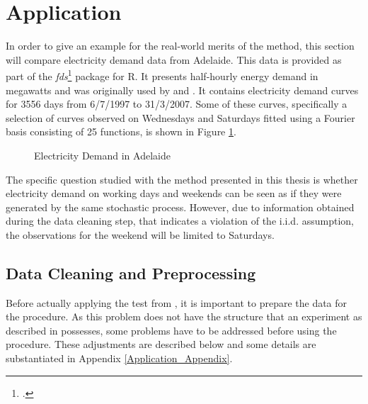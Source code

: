 \documentclass[12pt, a4paper]{article}
\theoremstyle{MAstyle} \newtheorem{assumption}{Assumption}[section]
\theoremstyle{MAstyle} \newtheorem{definition}{Definition}[section]
\theoremstyle{MAstyle} \newtheorem{theorem}{Theorem}[section]
\begin{document}
	\section{Application}\label{Application}
		In order to give an example for the real-world merits of the method, this section will compare electricity demand data from Adelaide. This data is provided as part of the \textit{fds}\footcite{fds} package for R. It presents half-hourly energy demand in megawatts and was originally used by \cite{magnano_generation_2007} and \cite{magnano_generation_2008}. It contains electricity demand curves for 3556 days from 6/7/1997 to 31/3/2007. Some of these curves, specifically a selection of curves observed on Wednesdays and Saturdays fitted using a Fourier basis consisting of 25 functions, is shown in Figure \ref{electricity_demand}.
		\begin{figure}[H]
			\caption{Electricity Demand in Adelaide}
			\label{electricity_demand}
		\end{figure}
	
		The specific question studied with the method presented in this thesis is whether electricity demand on working days and weekends can be seen as if they were generated by the same stochastic process. However, due to information obtained during the data cleaning step, that indicates a violation of the i.i.d. assumption, the observations for the weekend will be limited to Saturdays. 		
	
		\subsection{Data Cleaning and Preprocessing}
		Before actually applying the test from \cite{bugni_permutation_2021}, it is important to prepare the data for the procedure. As this problem does not have the structure that an experiment as described in \cite{bugni_permutation_2021} possesses, some problems have to be addressed before using the procedure. These adjustments are described below and some details are substantiated in Appendix \ref{Application_Appendix}.
		
\end{document}
